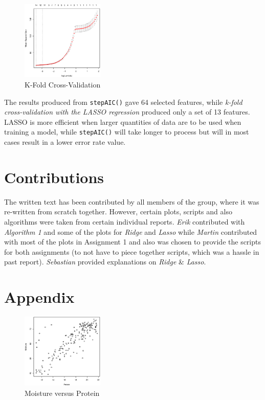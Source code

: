 \documentclass[a4paper, twocolumn]{article}
\begin{document}
    \begin{figure}[h]
        \centering
        \caption{K-Fold Cross-Validation}
        \label{fig:kfold}
        \includegraphics[width=0.35\textwidth]{share/kfold.eps}
    \end{figure}

    The results produced from \texttt{stepAIC()} gave 64 selected features, while \emph{k-fold cross-validation with the LASSO regression} produced only a set of 13 features. LASSO is more efficient when larger quantities of data are to be used when training a model, while \texttt{stepAIC()} will take longer to process but will in most cases result in a lower error rate value.

    \section*{Contributions}

    The written text has been contributed by all members of the group, where it was re-written from scratch together. However, certain plots, scripts and also algorithms were taken from certain individual reports. \emph{Erik} contributed with \emph{Algorithm 1} and some of the plots for \emph{Ridge} and \emph{Lasso} while \emph{Martin} contributed with most of the plots in Assignment 1 and also was chosen to provide the scripts for both assignments (to not have to piece together scripts, which was a hassle in past report). \emph{Sebastian} provided explanations on \emph{Ridge} \& \emph{Lasso}.

    \nocite{*} %
    
    
    \onecolumn \appendix
    \section*{Appendix}

    
    

    \begin{figure}[h]
        \centering
        \caption{Moisture versus Protein}
        \label{fig:moistprot}
        \includegraphics[width=0.35\textwidth]{share/linear.eps}
    \end{figure}
\end{document}
